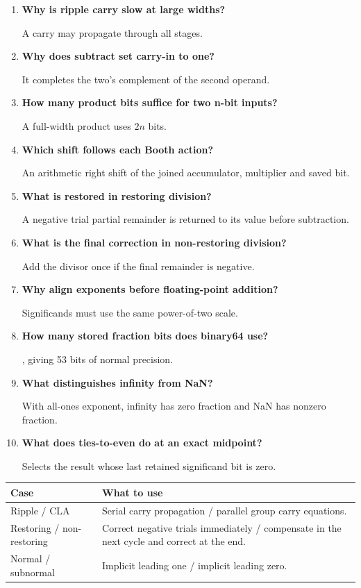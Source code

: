 \documentclass[12pt,a4paper]{article}
\newcommand{\Q}[1]{\textbf{#1}\par\noindent\ignorespaces}
\begin{document}
\begin{tcolorbox}[exambox,title={Frequently Asked / Viva Questions}]
\begin{enumerate}[topsep=0pt, label=\textbf{Q\arabic*.}, itemsep=5pt]
\item \Q{Why is ripple carry slow at large widths?}
A carry may propagate through all stages.
\item \Q{Why does subtract set carry-in to one?}
It completes the two's complement of the second operand.
\item \Q{How many product bits suffice for two n-bit inputs?}
A full-width product uses $2n$ bits.
\item \Q{Which shift follows each Booth action?}
An arithmetic right shift of the joined accumulator, multiplier and saved bit.
\item \Q{What is restored in restoring division?}
A negative trial partial remainder is returned to its value before subtraction.
\item \Q{What is the final correction in non-restoring division?}
Add the divisor once if the final remainder is negative.
\item \Q{Why align exponents before floating-point addition?}
Significands must use the same power-of-two scale.
\item \Q{How many stored fraction bits does binary64 use?}
52, giving 53 bits of normal precision.
\item \Q{What distinguishes infinity from NaN?}
With all-ones exponent, infinity has zero fraction and NaN has nonzero fraction.
\item \Q{What does ties-to-even do at an exact midpoint?}
Selects the result whose last retained significand bit is zero.
\end{enumerate}
\end{tcolorbox}
\begin{tcolorbox}[tikzbox,title={Summary comparison}]
\begin{tabularx}{\linewidth}{|B{4cm}|Y|}\hline
\textbf{Case} & \textbf{What to use} \\ \hline
Ripple / CLA & Serial carry propagation / parallel group carry equations. \\ \hline
Restoring / non-restoring & Correct negative trials immediately / compensate in the next cycle and correct at the end. \\ \hline
Normal / subnormal & Implicit leading one / implicit leading zero. \\ \hline
\end{tabularx}
\end{tcolorbox}
\end{document}
